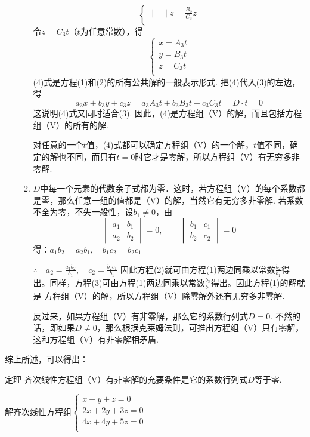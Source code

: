 \begin{enumerate}
\begin{enumerate}[(1)]
\[\begin{cases}
{\begin{vmatrix}
    \end{vmatrix} }z=\frac{B_3}{C_3}z\\
\end{cases}\]
令$z=C_3 t$（$t$为任意常数），得
\begin{equation}
  \begin{cases}
    x=A_3 t\\
    y=B_3 t\\
    z=C_3 t\\
  \end{cases}\tag{4}
\end{equation}
(4)式是方程(1)和(2)的所有公共解的一般表示形式. 把(4)代入(3)的左边，得
\[a_3x+b_3y+c_3z=a_3A_3t+b_3B_3t+c_3C_3t=D\cdot t=0\]
这说明(4)式又同时适合(3). 因此，(4)是方程组（V）的解，而且包括方程组（V）的所有的解.

对任意的一个$t$值，(4)式都可以确定方程组（V）的一个解，$t$值不同，确定的解也不同，而只有$t=0$时它才是零解，所以方程组（V）有无穷多非零解.
\item  $D$中每一个元素的代数余子式都为零．这时，若方程组（V）的每个系数都是零，那么任意一组的值都是（V）的解，当然它有无穷多非零解. 若系数不全为零，不失一般性，设$b_1\ne 0$，由
\[\begin{vmatrix}
  a_1&b_1\\a_2&b_2
\end{vmatrix}=0,\qquad \begin{vmatrix}
  b_1&c_1\\b_2&c_2
\end{vmatrix}=0\]
得：$a_1b_2=a_2b_1,\quad b_1c_2=b_2c_1$

$\therefore\quad a_2=\frac{a_1b_2}{b_1},\quad c_2=\frac{b_2c_1}{b_1}$
因此方程(2)就可由方程(1)两边同乘以常数$\frac{b_2}{b_1}$得出。同样，方程(3)可由方程(1)两边同乘以常数$\frac{b_3}{b_1}$得出。因此方程(1)的解就是
方程组（V）的解，所以方程组（V）除零解外还有无穷多非零解.

反过来，如果方程组（V）有非零解，那么它的系数行列式$D=0$. 不然的话，即如果$D\ne 0$，那么根据克莱姆法则，可推出方程组（V）只有零解，这和方程组（V）有非零解相矛盾.
\end{enumerate}
\end{enumerate}

综上所述，可以得出：

\begin{thm}
  {定理} 齐次线性方程组（V）有非零解的充要条件是它的系数行列式$D$等于零.
\end{thm}

\begin{example}
  解齐次线性方程组$\begin{cases}
    x+y+z=0\\
    2x+2y+3z=0\\
    4x+4y+5z=0\\
  \end{cases}$
\end{example}

